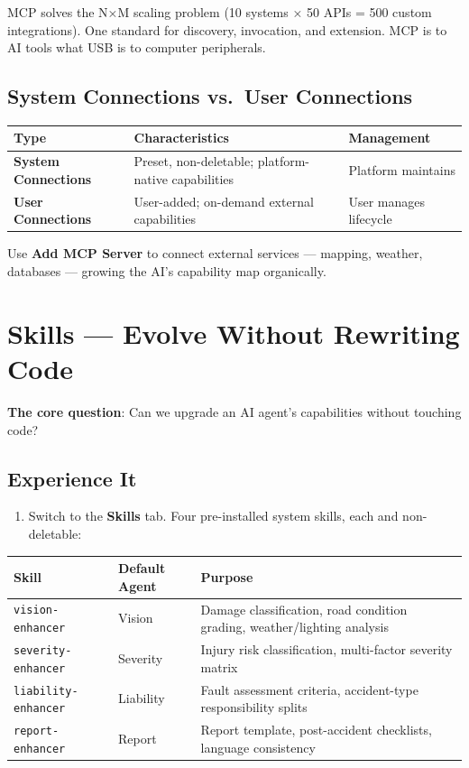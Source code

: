 \documentclass[
  paper=a4,
  fontsize=10pt,
  DIV=14,
  headings=normal,
  headsepline=true,
  parskip=half,
]{scrartcl}
\newcommand{\code}[1]{\lstinline[basicstyle=\ttfamily\small,breaklines=false]|#1|}
\newcommand{\eltaginfo}[1]{\tcbox[on line,size=small,colback=black!10,colframe=black!50,boxrule=0.5pt,arc=2pt,left=3pt,right=3pt,top=0.5pt,bottom=0.5pt]{\small #1}}
\begin{document}
MCP solves the N×M scaling problem (10 systems × 50 APIs = 500 custom integrations). One standard for discovery, invocation, and extension. MCP is to AI tools what USB is to computer peripherals.

\subsection{System Connections vs.\ User Connections}

\medskip
\begin{tabularx}{\textwidth}{@{} l L L @{}}
\toprule

\textbf{Type} & \textbf{Characteristics} & \textbf{Management} \\
\midrule
\textbf{System Connections} & Preset, non-deletable; platform-native capabilities & Platform maintains \\
\textbf{User Connections}   & User-added; on-demand external capabilities  & User manages lifecycle \\
\bottomrule
\end{tabularx}
\medskip

Use \textbf{Add MCP Server} to connect external services — mapping, weather, databases — growing the AI's capability map organically.

\section{Skills — Evolve Without Rewriting Code}

\textbf{The core question}: Can we upgrade an AI agent's capabilities without touching code?

\subsection{Experience It}

\begin{enumerate}
  \item Switch to the \textbf{Skills} tab. Four pre-installed system skills, each \eltaginfo{System} and non-deletable:
\end{enumerate}

\medskip
\begin{tabularx}{\textwidth}{@{} l l L @{}}
\toprule

\textbf{Skill} & \textbf{Default Agent} & \textbf{Purpose} \\
\midrule
\code{vision-enhancer}    & Vision    & Damage classification, road condition grading, weather/lighting analysis \\
\code{severity-enhancer}  & Severity  & Injury risk classification, multi-factor severity matrix \\
\code{liability-enhancer} & Liability & Fault assessment criteria, accident-type responsibility splits \\
\code{report-enhancer}    & Report    & Report template, post-accident checklists, language consistency \\
\bottomrule
\end{tabularx}
\medskip
\end{document}
